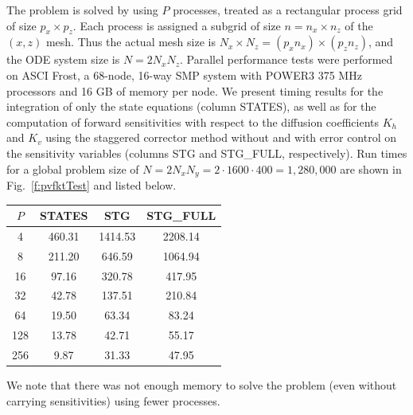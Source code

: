 The problem is solved by {\cvodes} using $P$ processes, treated as a 
rectangular process grid of size $p_x \times p_z$.
Each process is assigned a subgrid of size $n = n_x \times n_z$ of the 
$(x,z)$ mesh.  Thus the actual mesh size is 
$N_x \times N_z = (p_x n_x) \times (p_z n_z)$,
and the ODE system size is $N = 2 N_x N_z$.
Parallel performance tests were performed on ASCI Frost, a 68-node, 16-way SMP system
with POWER3 375 MHz processors and 16 GB of memory per node.
We present timing results for the integration of only the state equations
(column STATES), as well as for
the computation of forward sensitivities with respect to the diffusion coefficients
$K_h$ and $K_v$ using the staggered corrector method without and with 
error control on the sensitivity variables (columns STG and
STG\_FULL, respectively). 
Run times for a global problem size of
$N = 2 N_x N_y = 2 \cdot 1600 \cdot 400 = 1,280,000$ 
are shown in Fig.~\ref{f:pvfktTest} and listed below.

\begin{center}
  \begin{tabular}{cccc}\hline
    $P$ &  STATES  &   STG   & STG\_FULL \\ \hline
    4  &  460.31  &  1414.53  & 2208.14  \\
    8  &  211.20  &   646.59  & 1064.94  \\
    16  &   97.16  &   320.78  &  417.95  \\
    32  &   42.78  &   137.51  &  210.84  \\
    64  &   19.50  &    63.34  &   83.24  \\
    128  &   13.78  &    42.71  &   55.17  \\
    256  &    9.87  &    31.33  &   47.95  \\ \hline
  \end{tabular}
\end{center}

We note that there was not enough memory to solve the problem (even without
carrying sensitivities) using fewer processes.


